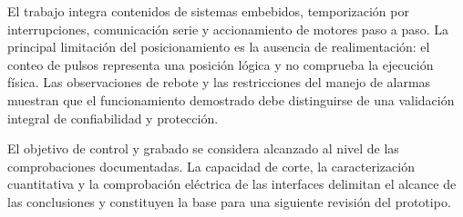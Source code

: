 \documentclass[blue,fullpaper]{ludusofficial}  %
\begin{document}
El trabajo integra contenidos de sistemas embebidos,
temporización por interrupciones, comunicación serie
y accionamiento de motores paso a paso. La principal
limitación del posicionamiento es la ausencia de
realimentación: el conteo de pulsos representa
una posición lógica y no comprueba la ejecución física.
Las observaciones de rebote y las restricciones
del manejo de alarmas muestran que el funcionamiento
demostrado debe distinguirse de una validación integral
de confiabilidad y protección.

El objetivo de control y grabado se considera alcanzado
al nivel de las comprobaciones documentadas.
La capacidad de corte, la caracterización cuantitativa
y la comprobación eléctrica de las interfaces
delimitan el alcance de las conclusiones y constituyen
la base para una siguiente revisión del prototipo.



\FloatBarrier
\clearpage


\end{document}
